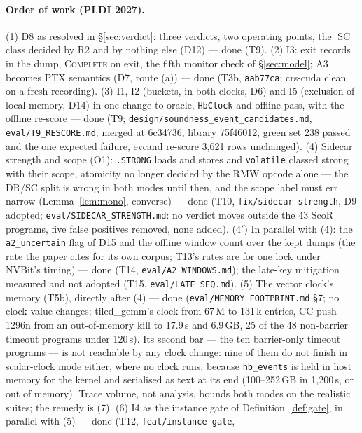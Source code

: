 \documentclass[11pt]{article}
\theoremstyle{remark}
\DeclareMathOperator{\SC}{SC}
\begin{document}
\paragraph{Order of work (PLDI 2027).}
(1) D8 as resolved in \S\ref{sec:verdict}: three verdicts, two operating points, the
$\SC$ class decided by R2 and by nothing else (D12) --- done (T9). (2) I3: exit records
in the dump, \textsc{Complete} on exit, the fifth monitor check of \S\ref{sec:model}; A3
becomes PTX semantics (D7, route (a)) --- done (T3b, \texttt{aab77ca}; crs-cuda clean on
a fresh recording). (3) I1, I2 (buckets, in both clocks, D6) and I5 (exclusion of local
memory, D14) in one change to oracle, \texttt{HbClock} and offline pass, with the offline re-score
--- done (T9; \texttt{design/soundness\_event\_candidates.md},
\texttt{eval/T9\_RESCORE.md}; merged at 6c34736, library 75f46012, green set 238 passed
and the one expected failure, evcand re-score 3,621 rows unchanged). (4) Sidecar strength
and scope (O1): \texttt{.STRONG} loads and stores and \texttt{volatile} classed strong
with their scope, atomicity no longer decided by the RMW opcode alone --- the DR/SC split
is wrong in both modes until then, and the scope label must err narrow
(Lemma~\ref{lem:mono}, converse) --- done (T10, \texttt{fix/sidecar-strength}, D9 adopted;
\texttt{eval/SIDECAR\_STRENGTH.md}: no verdict moves outside the 43 ScoR programs, five
false positives removed, none added). (4$'$) In parallel with (4): the \texttt{a2\_uncertain}
flag of D15 and the offline window count over the kept dumps (the rate the paper
cites for its own corpus; T13's rates are for one lock under NVBit's timing) --- done
(T14, \texttt{eval/A2\_WINDOWS.md}); the late-key mitigation measured and not adopted (T15,
\texttt{eval/LATE\_SEQ.md}). (5) The vector clock's memory (T5b), directly after (4) --- done
(\texttt{eval/MEMORY\_FOOTPRINT.md} \S7; no clock value changes; tiled\_gemm's clock from 67\,M
to 131\,k entries, CC push 1296n from an out-of-memory kill to 17.9\,s and 6.9\,GB, 25 of the
48 non-barrier timeout programs under 120\,s). Its second bar --- the ten barrier-only
timeout programs --- is not reachable by any clock change: nine of them do not finish in
scalar-clock mode either, where no clock runs, because \texttt{hb\_events} is held in host
memory for the kernel and serialised as text at its end (100--252\,GB in 1,200\,s, or out of
memory). Trace volume, not analysis, bounds both modes on the realistic suites; the remedy
is (7). (6) I4 as the instance gate of
Definition~\ref{def:gate}, in parallel with (5) --- done (T12, \texttt{feat/instance-gate},
\end{document}
